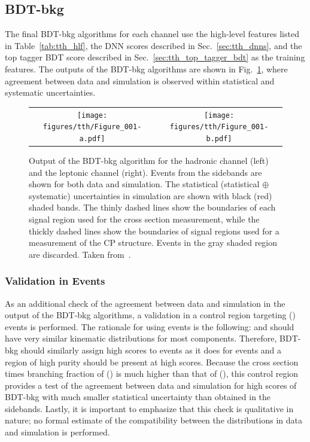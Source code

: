 \subsection{BDT-bkg}
The final BDT-bkg algorithms for each channel use the high-level features listed in Table~\ref{tab:tth_hlf}, the DNN scores described in Sec.~\ref{sec:tth_dnns}, and the top tagger BDT score described in Sec.~\ref{sec:tth_top_tagger_bdt} as the training features.
The outputs of the BDT-bkg algorithms are shown in Fig.~\ref{fig:tth_bdt-bkg}, where agreement between data and simulation is observed within statistical and systematic uncertainties.
\begin{figure} [htbp!]
    \centering
    \begin{tabular}{c c}
        \texttt{[image: figures/tth/Figure\_001-a.pdf]} &
        \texttt{[image: figures/tth/Figure\_001-b.pdf]}
    \end{tabular}
    \caption[Output of the BDT-bkg algorithm for the hadronic channel (left) and the leptonic channel (right). Taken from~\cite{tth_observation}.]{Output of the BDT-bkg algorithm for the hadronic channel (left) and the leptonic channel (right). Events from the \mgg sidebands are shown for both data and simulation. The statistical (statistical $\oplus$ systematic) uncertainties in simulation are shown with black (red) shaded bands. The thinly dashed lines show the boundaries of each signal region used for the cross section measurement, while the thickly dashed lines show the boundaries of signal regions used for a measurement of the CP structure. Events in the gray shaded region are discarded. Taken from~\cite{tth_observation}.}
    \label{fig:tth_bdt-bkg}
\end{figure}

\subsubsection{Validation in \ttZ Events}
As an additional check of the agreement between data and simulation in the output of the BDT-bkg algorithms, a validation in a control region targeting \ttZ (\Zee) events is performed.
The rationale for using \ttZ events is the following: \ttZ and \ttH should have very similar kinematic distributions for most components.
Therefore, BDT-bkg should similarly assign high scores to \ttZ events as it does for \ttH events and a region of high \ttZ purity should be present at high scores.
Because the cross section times branching fraction of \ttZ (\Zee) is much higher than that of \ttH (\Hgg), this control region provides a test of the agreement between data and simulation for high scores of BDT-bkg with much smaller statistical uncertainty than obtained in the \mgg sidebands.
Lastly, it is important to emphasize that this check is qualitative in nature; no formal estimate of the compatibility between the distributions in data and simulation is performed.

